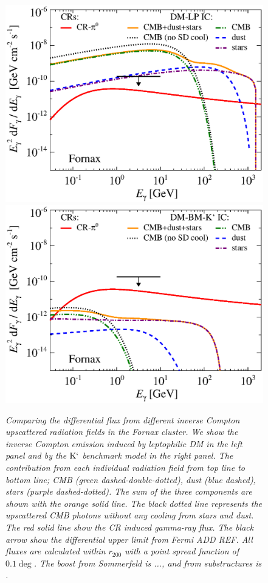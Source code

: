 \documentclass[10pt,aps,pra,reprint,amsmath,amsfonts,amssymb,showpacs]{revtex4-1}
\newcommand{\rmn}{\mathrm}
\newcommand{\rvir}{r_{200}}
\newcommand{\Km}{\rmn{K}`}
\begin{document}
\begin{figure}
\begin{minipage}{2.0\columnwidth}
\includegraphics[width=0.49\columnwidth]{figures/flux.IRcomp.v9.0.1deg.1.6T.SubMass.elmu.SF300.noMW.woGal.eps}
\includegraphics[width=0.49\columnwidth]{figures/flux.IRcomp.BMv9.0.1deg.SubMass.noMW.woGal.eps}
\caption{\it Comparing the differential flux from different inverse
  Compton upscattered radiation fields in the Fornax cluster. We show
  the inverse Compton emission induced by leptophilic DM in the left
  panel and by the $\Km$ benchmark model in the right panel. The
  contribution from each individual radiation field from top line to
  bottom line; CMB (green dashed-double-dotted), dust (blue dashed),
  stars (purple dashed-dotted). The sum of the three components are
  shown with the orange solid line. The black dotted line represents
  the upscattered CMB photons without any cooling from stars and
  dust. The red solid line show the CR induced gamma-ray flux. The
  black arrow show the differential upper limit from Fermi ADD
  REF. All fluxes are calculated within $\rvir$ with a point spread
  function of $0.1\deg$. The boost from Sommerfeld is ..., and from
  substructures is .}
 \label{fig6}
\end{minipage}
\end{figure}
\end{document}
